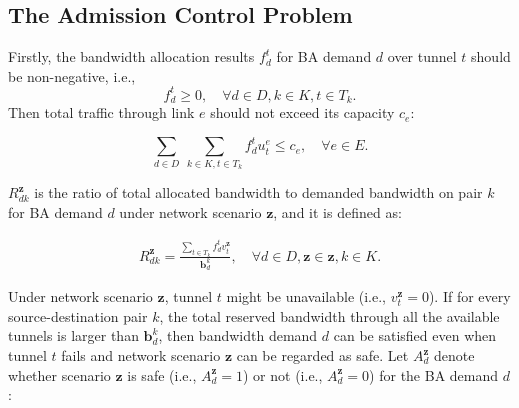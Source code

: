 \documentclass[sigconf]{acmart}
\begin{document}
 



\clearpage

\begin{appendices}
 \section{The Admission Control Problem} \label{admission_problem}
 
Firstly, the bandwidth allocation results $f_{d}^t$ for BA demand $d$ over tunnel $t$ should be non-negative, i.e.,
\begin{equation}
f_{d}^t \ge 0, \quad\forall d \in D ,  k\in K,  t\in T_{k}.
\label{constraint-f}
\end{equation}
Then total traffic through link $e$ should not exceed its capacity $c_e$:

\begin{equation}
 \sum_{d \in D}\ \sum_{k\in K, t\in T_{k}}f_{d}^tu_t^e \le c_e, \quad \forall e \in E.
\label{constraint-e}
\end{equation}


$R_{dk}^{\mathbf{z}}$ is the ratio of total allocated bandwidth to demanded bandwidth on pair $k$ for BA demand $d$ under network scenario $\mathbf{z}$, and it is  defined as:

 \begin{eqnarray} \label{R}
R_{dk}^{\mathbf{z}}=\frac{\sum_{t\in T_{k}}f_{d}^tv_t^{\mathbf{z}} }{\mathbf{b}^k_d}, \quad \forall  d \in D, \mathbf{z}\in \mathbf{z}, k \in K.
\end{eqnarray}

Under network scenario $\mathbf{z}$, tunnel $t$ might be unavailable (i.e., $v_t^{\mathbf{z}} =0$).
If for every source-destination pair $k$, the total reserved bandwidth through all the available tunnels is larger than $\mathbf{b}^k_d$,  then bandwidth demand $d$ can be satisfied even when tunnel $t$ fails and network scenario $\mathbf{z}$ can be regarded as safe.
Let $A_d^{\mathbf{z}}$ denote whether scenario $\mathbf{z}$ is safe (i.e., $A_d^{\mathbf{z}}=1$) or not (i.e., $A_d^{\mathbf{z}}=0$) for the BA demand $d$:


\end{appendices}
\end{document}
